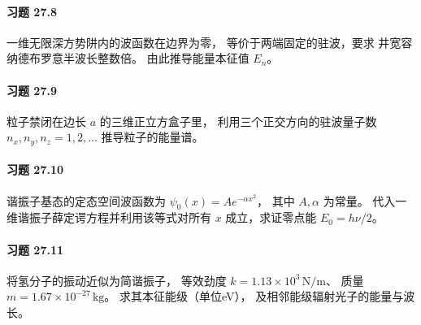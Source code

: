 \paragraph{习题 27.8}
一维无限深方势阱内的波函数在边界为零，
等价于两端固定的驻波，要求
井宽容纳德布罗意半波长整数倍。
由此推导能量本征值 \(E_n\)。
\paragraph{习题 27.9}
粒子禁闭在边长 \(a\) 的三维正立方盒子里，
利用三个正交方向的驻波量子数
\(n_x,n_y,n_z=1,2,\dots\)
推导粒子的能量谱。
\paragraph{习题 27.10}
谐振子基态的定态空间波函数为
\(\psi_0(x)=Ae^{-\alpha x^2}\)，
其中 \(A,\alpha\) 为常量。
代入一维谐振子薛定谔方程并利用该等式对所有
\(x\) 成立，求证零点能 \(E_0=h\nu/2\)。
\paragraph{习题 27.11}
将氢分子的振动近似为简谐振子，
等效劲度 \(k=1.13\times10^3\,\mathrm{N/m}\)、
质量 \(m=1.67\times10^{-27}\,\mathrm{kg}\)。
求其本征能级（单位eV），
及相邻能级辐射光子的能量与波长。

